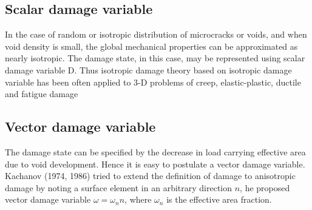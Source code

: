 \documentclass[12pt]{report}
\begin{document}
\subsection{Scalar damage variable}
\indent\indent\indent In the case of random or isotropic distribution of microcracks or voids, and when void density is small, the global mechanical properties can be approximated as nearly isotropic. The damage state, in this case, may be represented using scalar damage variable D. Thus isotropic damage theory based on isotropic damage variable has been often applied to 3-D problems of creep, elastic-plastic, ductile and fatigue damage
\subsection{Vector damage variable}
\indent\indent\indent The damage state can be specified by the decrease in load carrying effective area due to void development. Hence it is easy to postulate a vector damage variable. Kachanov (1974, 1986) tried to extend the definition of damage to anisotropic damage by noting a surface element in an arbitrary direction $n$, he proposed vector damage variable $ \omega = \omega_{n}n$, where $\omega_{n}$ is the effective area fraction. 
\end{document}
